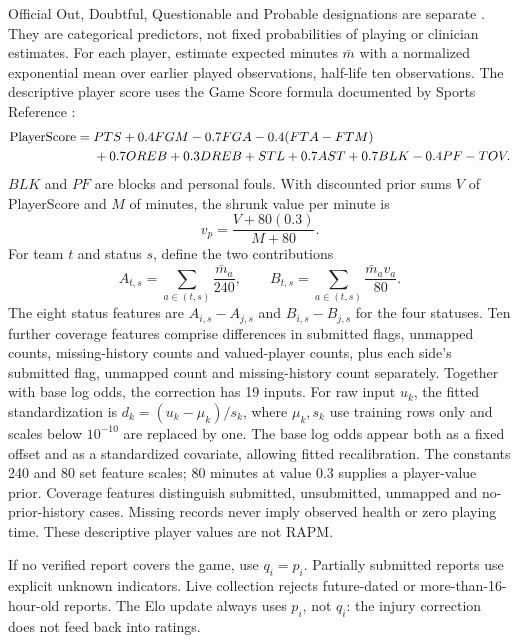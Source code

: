 \documentclass[11pt]{article}
\begin{document}
Official Out, Doubtful, Questionable and Probable designations are separate
\cite{injuries}. They are categorical predictors, not fixed probabilities
of playing or clinician estimates.
For each player, estimate expected minutes $\bar m$ with a normalized
exponential mean over earlier played observations, half-life ten observations.
The descriptive player score uses the Game Score formula documented by
Sports Reference \cite{gamescore}:
\begin{align}
 \mathrm{PlayerScore}={}&PTS+0.4FGM-0.7FGA-0.4(FTA-FTM)\notag\\
 &+0.7OREB+0.3DREB+STL+0.7AST+0.7BLK-0.4PF-TOV.
\end{align}
$BLK$ and $PF$ are blocks and personal fouls. With discounted prior sums
$V$ of PlayerScore and $M$ of minutes, the shrunk value per minute is
\begin{equation}
 v_p=\frac{V+80(0.3)}{M+80}.
\end{equation}
For team $t$ and status $s$, define the two contributions
\begin{equation}
 A_{t,s}=\sum_{a\in(t,s)}\frac{\bar m_a}{240},\qquad
 B_{t,s}=\sum_{a\in(t,s)}\frac{\bar m_a v_a}{80}.
\end{equation}
The eight status features are $A_{i,s}-A_{j,s}$ and $B_{i,s}-B_{j,s}$
for the four statuses. Ten further coverage features comprise differences
in submitted flags, unmapped counts, missing-history counts and valued-player
counts, plus each side's submitted flag, unmapped count and missing-history
count separately. Together with base log odds, the correction has 19 inputs.
For raw input $u_k$, the fitted standardization is
$d_k=(u_k-\mu_k)/s_k$, where $\mu_k,s_k$ use training rows only and
scales below $10^{-10}$ are replaced by one. The base log odds appear both as a fixed
offset and as a standardized covariate, allowing fitted recalibration. The constants 240 and
80 set feature scales; 80 minutes at value 0.3 supplies a player-value prior.
Coverage features distinguish submitted, unsubmitted, unmapped and
no-prior-history cases. Missing records never imply observed health or zero
playing time. These descriptive player values are not RAPM.

If no verified report covers the game, use $q_i=p_i$. Partially submitted
reports use explicit unknown indicators. Live collection rejects future-dated
or more-than-16-hour-old reports. The Elo update always uses $p_i$, not $q_i$:
the injury correction does not feed back into ratings.
\end{document}
